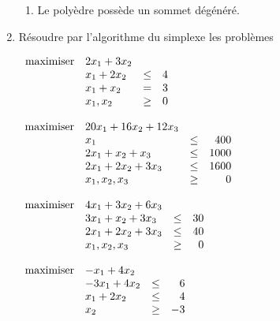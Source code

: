 \begin{enumerate}
\begin{enumerate}
      \item Le poly\`edre possède un sommet dégénéré.




    \end{enumerate}







    \begin{solution}
      \nosolution
    \end{solution}

  \item
    Résoudre par l'algorithme du simplexe les problèmes



    $
    \begin{array}{llcr}
      \mbox{maximiser} & 2x_1+3x_2\\
      & x_1+2x_2 & \leq & 4\\
      & x_1+x_2 & = & 3\\
      & x_1, x_2& \geq & 0
    \end{array}
    $



    $
    \begin{array}{llcr}
      \mbox{maximiser} & 20 x_1+16x_2+12 x_3\\
      & x_1  & \leq & 400\\
      &2x_1+x_2+x_3 & \leq & 1000\\
      &2x_1+2x_2+ 3x_3 & \leq & 1600\\
      & x_1, x_2, x_3 & \geq & 0
    \end{array}
    $



    $
    \begin{array}{llcr}
      \mbox{maximiser} & 4x_1+3x_2+6x_3\\
      & 3x_1+x_2+3x_3 & \leq & 30\\
      & 2x_1+2x_2+3x_3 & \leq & 40\\
      & x_1, x_2, x_3 & \geq & 0
    \end{array}
    $





    $
    \begin{array}{llcr}
      \mbox{maximiser} & -x_1+4x_2\\
      & -3x_1+4x_2 & \leq & 6\\
      & x_1+2x_2 & \leq & 4\\
      & x_2& \geq & -3
    \end{array}
    $









\end{enumerate}
